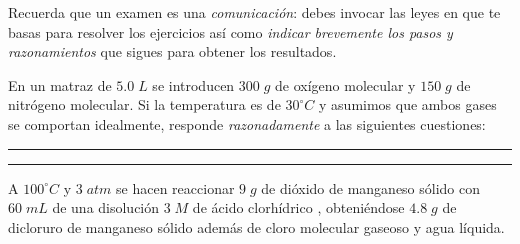 \documentclass[a4paper,addpoints,12pt]{exam}
\newcommand{\halmos}{\vspace*{-6mm}
	
					\begin{flushright}
						\rule{1mm}{2.5mm} 
					\end{flushright}
					\vspace*{-4mm}
						
					  }
\renewcommand{\qed}{\halmos}
\begin{document}
\begin{problemas}{Recuerda que un examen es una \textit{comunicación}: debes invocar las leyes en que te basas para resolver los ejercicios así como \textit{indicar brevemente los pasos y razonamientos} que sigues para obtener los resultados.}
\end{problemas}
\vspace{1ex}


\begin{questions}

\question[2] En un matraz de $5.0\;L$ se introducen $300\;g$ de oxígeno molecular y $150\;g$ de nitrógeno molecular. Si la temperatura es de $30^\circ C$ y asumimos que ambos gases se comportan idealmente, responde \textit{razonadamente} a las siguientes cuestiones:
\qed


\question[2] 
\qed


\question[2]   A $100^\circ C$ y $3\;atm$  se hacen reaccionar $9\;g$ de dióxido de manganeso sólido con $60\;mL$ de una disolución $3\;M$ de ácido clorhídrico , obteniéndose $4.8\;g$ de dicloruro de manganeso sólido además de cloro molecular gaseoso y agua líquida.
\end{questions}
\end{document}

